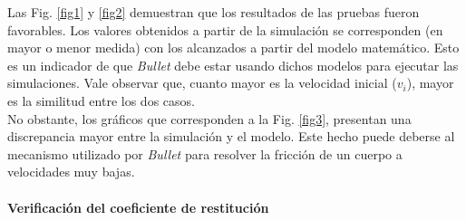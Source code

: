 \documentclass{article}
\begin{document}
\noindent Las Fig. \ref{fig1} y \ref{fig2} demuestran que los resultados de las pruebas fueron favorables. Los valores obtenidos a partir de la simulaci\'on se corresponden (en mayor o menor medida) con los alcanzados a partir del modelo matem\'atico. Esto es un indicador de que \textit{Bullet} debe estar usando dichos modelos para ejecutar las simulaciones. Vale observar que, cuanto mayor es la velocidad inicial ($v_{i}$), mayor es la similitud entre los dos casos.\\
No obstante, los gr\'aficos que corresponden a la Fig. \ref{fig3}, presentan una discrepancia mayor entre la simulaci\'on y el modelo. Este hecho puede deberse al mecanismo utilizado por \textit{Bullet} para resolver la fricci\'on de un cuerpo a velocidades muy bajas.

\paragraph{Verificaci\'on del coeficiente de restituci\'on}\mbox{}
\end{document}
